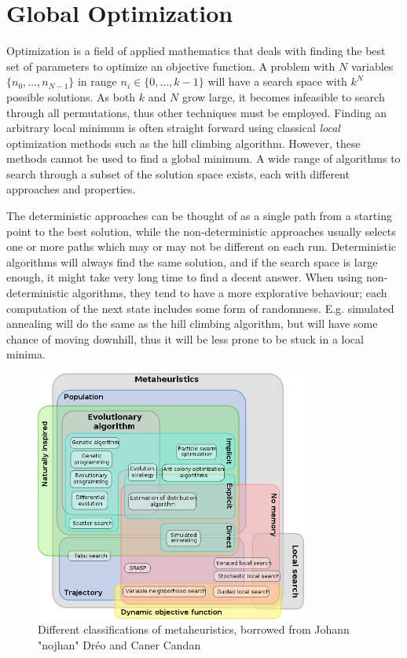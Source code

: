 \section{Global Optimization}

Optimization is a field of applied mathematics that deals with finding the best
set of parameters to optimize an objective function. A problem with $N$
variables $\{n_0, \dots, n_{N-1}\}$ in range $n_i \in \{0, \dots, k-1\}$ will
have a search space with $k^N$ possible solutions. As both $k$ and $N$ grow
large, it becomes infeasible to search through all permutations, thus other
techniques must be employed. Finding an arbitrary local minimum is often
straight forward using classical \emph{local} optimization methods such as the
hill climbing algorithm. However, these methods cannot be used to find a global
minimum\cite{russellnorvig}. A wide range of algorithms to search through a
subset of the solution space exists, each with different approaches and
properties.

The deterministic approaches can be thought of as a single path from a starting
point to the best solution, while the non-deterministic approaches usually selects
one or more paths which may or may not be different on each run. Deterministic algorithms
will always find the same solution, and if the search space is large enough, it might
take very long time to find a decent answer. When using non-deterministic algorithms,
they tend to have a more explorative behaviour; each computation of the next state includes
some form of randomness. E.g. simulated annealing will do the same as the hill climbing algorithm, but
will have some chance of moving downhill, thus it will be less prone to be stuck in a local minima.

\begin{figure}
    \centering
    \includegraphics[width=0.8\textwidth]{figs/630px-Metaheuristics_classification.png}
    \caption{Different classifications of metaheuristics, borrowed from Johann "nojhan" Dréo and Caner Candan\cite{wikimetaheuristics}}
    \label{fig:metaheuristics}
\end{figure}

